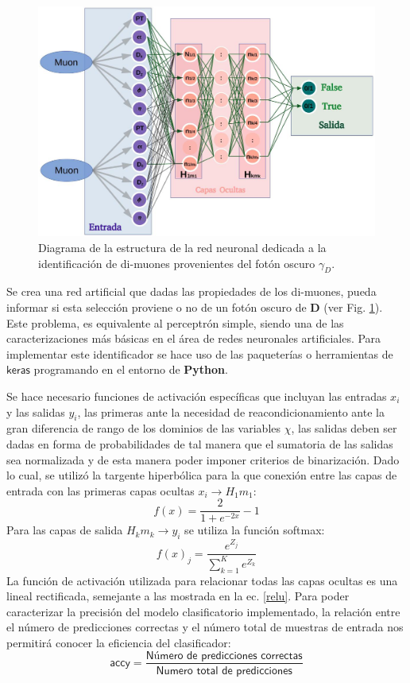 \begin{figure}[!h]
\centering
\includegraphics[width=.9\textwidth]{Simulacion/imagenes/IDENTIFICADOR.png}
\caption{Diagrama de la estructura de la red neuronal dedicada a la identificación de di-muones provenientes del fotón oscuro $\gamma_D$.}
\label{identificador}
\end{figure}

Se crea una red artificial que dadas las propiedades de los di-muones, pueda informar si esta selección proviene o no de un fotón oscuro de \MSSM\textbf{D} (ver Fig. \ref{identificador}). Este problema, es equivalente al perceptrón simple, siendo una de las caracterizaciones más básicas en el área de redes neuronales artificiales.
Para implementar este identificador se hace uso de las paqueterías o herramientas de $\textsf{keras}$ programando en el entorno de \textbf{Python}.

Se hace necesario funciones de activación específicas que incluyan las entradas $x_i$ y las salidas $y_i$, las primeras ante la necesidad de reacondicionamiento ante la gran diferencia de rango de los dominios de las variables $\chi$, las salidas deben ser dadas en forma de probabilidades de tal manera que el sumatoria de las salidas sea normalizada y de esta manera poder imponer criterios de binarización. Dado lo cual, se utilizó la targente hiperbólica para la que conexión entre las capas de entrada con las primeras capas ocultas $x_i \longrightarrow H_1m_1$:
\begin{equation}
f(x)=\dfrac{2}{1+e^{-2x}}-1
\end{equation}
Para las capas de salida $H_km_k \longrightarrow y_i$ se utiliza la función softmax:
\begin{equation}
f(x)_j = \dfrac{e^{Z_j}}{\sum_{k=1}^{K}e^{Z_k}}
\end{equation}
La función de activación utilizada para relacionar todas las capas ocultas es una lineal rectificada, semejante a las mostrada en la ec. \ref{relu}. Para poder caracterizar la precisión del modelo clasificatorio implementado, la relación entre el número de predicciones correctas y el número total de muestras de entrada nos permitirá conocer la eficiencia del clasificador:
\begin{equation}
\textsf{accy} =  \dfrac{\textsf{Número de predicciones correctas}}{\textsf{Numero total de predicciones}}
\end{equation}

